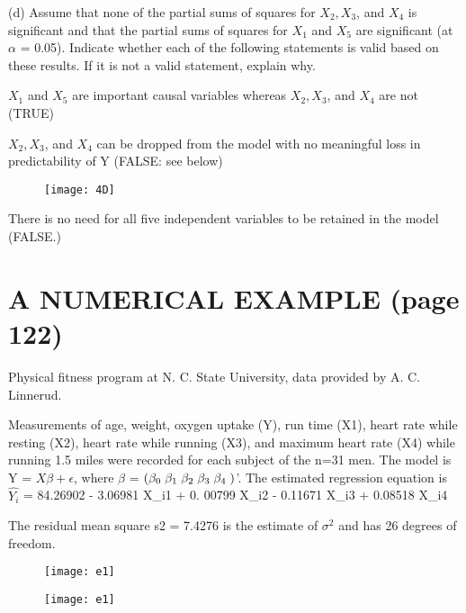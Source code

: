 \documentclass[letterpaper,11pt]{article}
\begin{document}
{(d) Assume that none of the partial sums of squares for $X_{2}, X_{3}$, and $X_{4}$ is significant and that the partial sums of squares for
$X_{1}$ and $X_{5}$ are significant (at $\alpha$ = 0.05). Indicate whether each of the following statements is valid based on these results. 
If it is not a valid statement, explain why.

$X_{1}$ and $X_{5}$ are important causal variables whereas $X_{2}, X_{3}$, and $X_{4}$ are not (TRUE)

$X_{2}, X_{3}$, and $X_{4}$ can be dropped from the model with no meaningful loss in predictability of Y (FALSE: see below)

	\begin{figure}[htbp]
	\centering
	\texttt{[image: 4D]}
	\end{figure}

There is no need for all five independent variables to be retained in the model (FALSE.)

\section{A NUMERICAL EXAMPLE (page 122)}

Physical fitness program at N. C. State University, data provided by A. C. Linnerud.

Measurements of age, weight, oxygen uptake (Y), run time (X1), heart rate while resting (X2), heart rate while
running (X3), and maximum heart rate (X4) while running 1.5 miles were recorded for each subject of the n=31 
men. The model is Y = $X \beta + \epsilon$, where $\beta$ = $(\beta_{0} \hspace{0.1cm} \beta_{1} \hspace{0.1cm} \beta_{2} \hspace{0.1cm} 
\beta_{3} \hspace{0.1cm} \beta_{4} \hspace{0.1cm} )$'. The estimated regression equation is $\hat{Y_{i}}$ = 84.26902 - 3.06981 X_{i1} + 0.
00799 X_{i2}  - 0.11671 X_{i3}  + 0.08518 X_{i4}

The residual mean square s2 = 7.4276 is the estimate of $\sigma^{2}$ and has 26 degrees of freedom.

	\begin{figure}[htbp]
	\centering
	\texttt{[image: e1]}
	\end{figure}
 
	\begin{figure}[htbp]
	\centering
	\texttt{[image: e1]}
	\end{figure}
	
}
\end{document}
